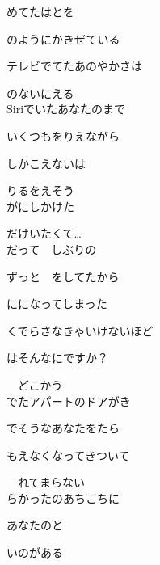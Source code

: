めてたはとを

のようにかきぜている

テレビでてたあのやかさは

のないにえる
\\

Siriでいたあなたのまで

いくつもをりえながら

しかこえないは

りるをえそう
\\

がにしかけた


だけいたくて…
\\

だって　しぶりの

ずっと　をしてたから

にになってしまった

くでらさなきゃいけないほど

はそんなにですか？

　どこかう
\\

でたアパートのドアがき

でそうなあなたをたら

もえなくなってきついて

　れてまらない
\\

らかったのあちこちに

あなたのと

いのがある
\\

